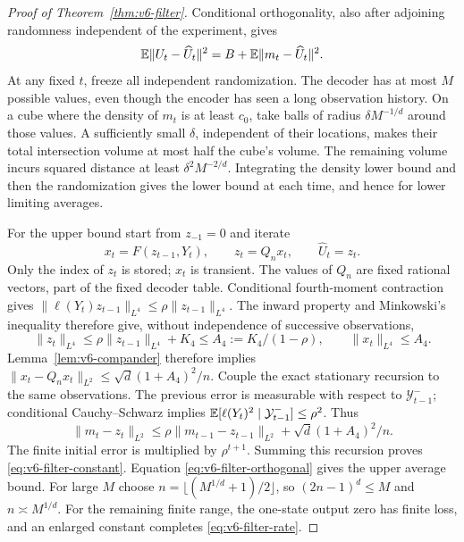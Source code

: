 \begin{proof}[Proof of Theorem~\ref{thm:v6-filter}]
Conditional orthogonality, also after adjoining randomness independent
of the experiment, gives
\begin{equation}
 \mathbb E\|U_t-\widehat U_t\|^2=B+\mathbb E\|m_t-\widehat U_t\|^2.   \label{eq:v6-filter-orthogonal}
\end{equation}
At any fixed $t$, freeze all independent randomization. The decoder
has at most $M$ possible values, even though the encoder has seen a
long observation history. On a cube where the density of $m_t$ is at
least $c_0$, take balls of radius $\delta M^{-1/d}$ around those
values. A sufficiently small $\delta$, independent of their locations,
makes their total intersection volume at most half the cube's volume.
The remaining volume incurs squared distance at least
$\delta^2M^{-2/d}$. Integrating the density lower bound and then the
randomization gives the lower bound at each time, and hence for lower
limiting averages.

For the upper bound start from $z_{-1}=0$ and iterate
\begin{equation}
       x_t=F(z_{t-1},Y_t),\qquad z_t=Q_nx_t,
       \qquad\widehat U_t=z_t.                          \label{eq:v6-coded-filter}
\end{equation}
Only the index of $z_t$ is stored; $x_t$ is transient. The values of
$Q_n$ are fixed rational vectors, part of the fixed decoder table.
Conditional fourth-moment contraction gives
$\|\ell(Y_t)z_{t-1}\|_{L^4}\le\rho\|z_{t-1}\|_{L^4}$.
The inward property and Minkowski's inequality therefore give, without
independence of successive observations,
\[
 \|z_t\|_{L^4}\le\rho\|z_{t-1}\|_{L^4}+K_4
       \le A_4:=K_4/(1-\rho),\qquad \|x_t\|_{L^4}\le A_4.
\]
Lemma~\ref{lem:v6-compander} therefore implies
$\|x_t-Q_nx_t\|_{L^2}\le\sqrt d(1+A_4)^2/n$.
Couple the exact stationary recursion to the same observations.
The previous error is measurable with respect to $\mathcal Y_{t-1}^-$;
conditional Cauchy--Schwarz implies
$\mathbb E[\ell(Y_t)^2\mid\mathcal Y_{t-1}^-]\le\rho^2$. Thus
\[
 \|m_t-z_t\|_{L^2}\le\rho\|m_{t-1}-z_{t-1}\|_{L^2}
                         +\sqrt d(1+A_4)^2/n.
\]
The finite initial error is multiplied by $\rho^{t+1}$.
Summing this recursion proves \eqref{eq:v6-filter-constant}.
Equation \eqref{eq:v6-filter-orthogonal} gives the upper average bound.
For large $M$ choose $n=\lfloor(M^{1/d}+1)/2\rfloor$, so
$(2n-1)^d\le M$ and $n\asymp M^{1/d}$. For the remaining finite range,
the one-state output zero has finite loss, and an enlarged constant
completes \eqref{eq:v6-filter-rate}.
\end{proof}

